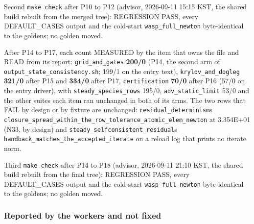 \documentclass[english,a4paper]{my_memo}
\begin{document}
Second \texttt{make\ check} after P10 to P12 (advisor, 2026-09-11 15:15 KST, the shared build rebuilt from the merged tree): REGRESSION PASS, every DEFAULT\_CASES output and the cold-start \texttt{wasp\_full\_newton} byte-identical to the goldens; no golden moved.

After P14 to P17, each count MEASURED by the item that owns the file and READ
from its report: \texttt{grid\_and\_gates} \textbf{200/0} (P14, the second arm of
\texttt{output\_state\_consistency.sh}; 199/1 on the entry text),
\texttt{krylov\_and\_dogleg} \textbf{321/0} after P15 and \textbf{334/0} after P17,
\texttt{certification} \textbf{70/0} after P16 (57/0 on the entry driver), with
\texttt{steady\_species\_rows} 195/0, \texttt{adv\_static\_limit} 53/0 and the other suites each
item ran unchanged in both of its arms. The two rows that FAIL by design or by
fixture are unchanged: \texttt{residual\_determinism}\textquotesingle s
\texttt{closure\_spread\_within\_the\_row\_tolerance\_atomic\_elem\_newton} at 3.354E+01 (N33,
by design) and \texttt{steady\_selfconsistent\_residual}\textquotesingle s
\texttt{handback\_matches\_the\_accepted\_iterate} on a reload log that prints no iterate
norm.

Third \texttt{make\ check} after P14 to P18 (advisor, 2026-09-11 21:10 KST, the shared build rebuilt from the final tree): REGRESSION PASS, every DEFAULT\_CASES output and the cold-start \texttt{wasp\_full\_newton} byte-identical to the goldens; no golden moved.

\subsubsection{Reported by the workers and not fixed}\label{reported-by-the-workers-and-not-fixed}
\end{document}

